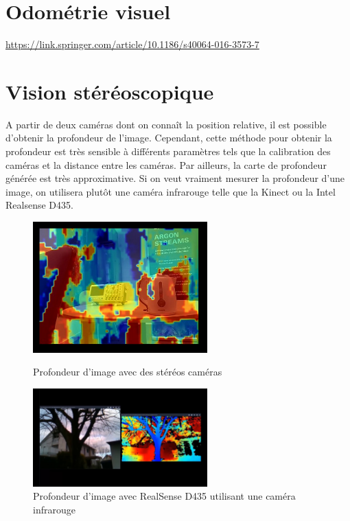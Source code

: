 \documentclass[a4paper, 11pt]{report}
\begin{document}
\section{Odométrie visuel}

\url{https://link.springer.com/article/10.1186/s40064-016-3573-7}

\section{Vision stéréoscopique}
A partir de deux caméras dont on connaît la position relative, il est possible d'obtenir la profondeur de l'image. Cependant, cette méthode pour obtenir la profondeur est très sensible à différents paramètres tels que la calibration des caméras et la distance entre les caméras. Par ailleurs, la carte de profondeur générée est très approximative. Si on veut vraiment mesurer la profondeur d'une image, on utilisera plutôt une caméra infrarouge telle que la Kinect ou la Intel Realsense D435.

\begin{figure}[h!]
\begin{centering}
\includegraphics[width=0.6\textwidth]{images/depthMapStereo.jpg}
\caption{Profondeur d'image avec des stéréos caméras}
\includegraphics[width=0.6\textwidth]{images/depthMapRealSense.jpg}
\caption{Profondeur d'image avec RealSense D435 utilisant une caméra infrarouge}
\par\end{centering}
\end{figure}
\end{document}
